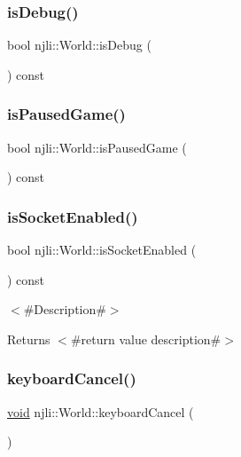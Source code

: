 \subsubsection{\texorpdfstring{is\+Debug()}{isDebug()}}
{\footnotesize\ttfamily bool njli\+::\+World\+::is\+Debug (\begin{DoxyParamCaption}{ }\end{DoxyParamCaption}) const}

\mbox{\label{classnjli_1_1_world_abfbc1b055160d3c6a6ccd4f1ec784b0b}} 
\subsubsection{\texorpdfstring{is\+Paused\+Game()}{isPausedGame()}}
{\footnotesize\ttfamily bool njli\+::\+World\+::is\+Paused\+Game (\begin{DoxyParamCaption}{ }\end{DoxyParamCaption}) const}

\mbox{\label{classnjli_1_1_world_a776f8bf7c461ecac1db1b485828f6894}} 
\subsubsection{\texorpdfstring{is\+Socket\+Enabled()}{isSocketEnabled()}}
{\footnotesize\ttfamily bool njli\+::\+World\+::is\+Socket\+Enabled (\begin{DoxyParamCaption}{ }\end{DoxyParamCaption}) const}

$<$\#\+Description\#$>$

\begin{DoxyReturn}{Returns}
$<$\#return value description\#$>$ 
\end{DoxyReturn}
\mbox{\label{classnjli_1_1_world_a5ecc9ab5fe1c940ae021489d5574edf7}} 
\subsubsection{\texorpdfstring{keyboard\+Cancel()}{keyboardCancel()}}
{\footnotesize\ttfamily \mbox{\hyperlink{_thread_8h_af1e856da2e658414cb2456cb6f7ebc66}{void}} njli\+::\+World\+::keyboard\+Cancel (\begin{DoxyParamCaption}{ }\end{DoxyParamCaption})}

